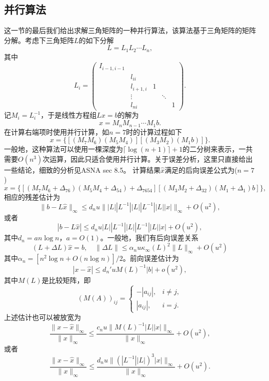 \documentclass[a4paper,10pt]{ctexart}
\begin{document}
\subsection{并行算法}
这一节的最后我们给出求解三角矩阵的一种并行算法，该算法基于三角矩阵的矩阵分解。考虑下三角矩阵$ L $的如下分解
\[
    L = L_1 L_2 \cdots L_{n},
\]
其中
\[
    L_i =
    \begin{pmatrix}
        I_{i-1,i-1} & & & & \\
        & l_{ii} & & & \\
        & l_{i+1,i} & 1 & &\\
        & \vdots & & \ddots &\\
        & l_{ni} & & & 1
    \end{pmatrix}. 
\]
记$ M_i = L^{-1}_i $，于是线性方程组$ Lx=b $的解为
\begin{equation}
    x = M_n M_{n-1} \cdots M_1 b.
\end{equation}
在计算右端项时使用并行计算，如$ n=7 $时的计算过程如下
\[
    x = \{[(M_7M_6)(M_5M_4)][(M_3M_2)(M_1b)]\}.
\]
一般地，这种算法可以使用一棵深度为$ \lceil\log(n+1)\rceil +1 $的二分树来表示，一共需要$ O(n^3) $次运算，因此只适合使用并行计算。关于误差分析，这里只直接给出一些结论，细致的分析见ASNA sec 8.5。
计算结果$ \hat{x} $满足的后向误差公式为($ n=7 $)
\begin{equation}
    \hat{x} = \{[(M_7M_6+\Delta_{76})(M_5M_4+\Delta_{54})+\Delta_{7654}][(M_3M_2+\Delta_{32})(M_1+\Delta_1)b]\},
\end{equation}
相应的残差估计为
\begin{equation}
    \| b - L\hat{x} \|_\infty \leqslant d_n u \| |L| |L^{-1}| |L| |L^{-1}| |L| |x| \|_\infty + O(u^2),
\end{equation}
或者
\begin{equation}
    | b - L\hat{x} | \leqslant d_n u |L| |L^{-1}| |L| |L^{-1}| |L| |x|  + O(u^2),
\end{equation}
其中$ d_n = an\log n $，$ a = O(1) $。一般地，我们有后向误差关系
\begin{equation}
    (L+\Delta L) \hat{x} = b,\quad \| \Delta L \| \leqslant \alpha_n u \kappa_\infty(L)^2 \| L \|_\infty +O(u^2)
\end{equation}
其中$ \alpha_n = [n^2 \log n +O(n \log n)] / 2 $。前向误差估计为
\begin{equation}
    |x - \hat{x}| \leqslant  d_n' u M(L)^{-1}|b| + o(u^2),
\end{equation}
其中$ M(L) $是比较矩阵，即
\[
    (M(A))_{ij} = 
    \begin{cases}
        -|a_{ij}|, & i\ne j,\\
        |a_{ij}|, & i=j.
    \end{cases}
\]
上述估计也可以被放宽为
\begin{equation}
    \frac{\| x - \hat{x} \|_\infty}{\| x \|_\infty} \leqslant \frac{c_n u \| M(L)^{-1}|L| |x| \|_\infty}{\| x \|_\infty} + O(u^2),
\end{equation}
或者
\begin{equation}
    \frac{\| x - \hat{x} \|_\infty}{\| x \|_\infty} \leqslant \frac{d_n u \| (|L^{-1}| |L|)^3 |x| \|_\infty}{\| x \|_\infty } + O(u^2).
\end{equation}
\end{document}

